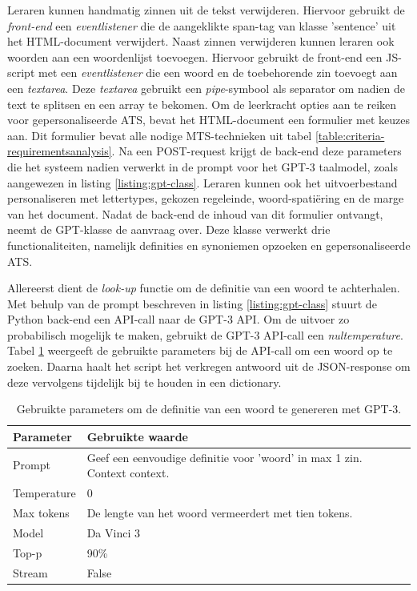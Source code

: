 Leraren kunnen handmatig zinnen uit de tekst verwijderen. Hiervoor gebruikt de \textit{front-end} een \textit{eventlistener} die de aangeklikte span-tag van klasse 'sentence' uit het HTML-document verwijdert. Naast zinnen verwijderen kunnen leraren ook woorden aan een woordenlijst toevoegen. Hiervoor gebruikt de front-end een JS-script met een \textit{eventlistener} die een woord en de toebehorende zin toevoegt aan een \textit{textarea}. Deze \textit{textarea} gebruikt een \textit{pipe}-symbool als separator om nadien de text te splitsen en een array te bekomen. Om de leerkracht opties aan te reiken voor gepersonaliseerde ATS, bevat het HTML-document een formulier met keuzes aan. Dit formulier bevat alle nodige MTS-technieken uit tabel \ref{table:criteria-requirementsanalysis}. Na een POST-request krijgt de back-end deze parameters die het systeem nadien verwerkt in de prompt voor het GPT-3 taalmodel, zoals aangewezen in listing \ref{listing:gpt-class}. Leraren kunnen ook het uitvoerbestand personaliseren met lettertypes, gekozen regeleinde, woord-spatiëring en de marge van het document. Nadat de back-end de inhoud van dit formulier ontvangt, neemt de GPT-klasse de aanvraag over. Deze klasse verwerkt drie functionaliteiten, namelijk definities en synoniemen opzoeken en gepersonaliseerde ATS.

\medspace

Allereerst dient de \textit{look-up} functie om de definitie van een woord te achterhalen. Met behulp van de prompt beschreven in listing \ref{listing:gpt-class} stuurt de Python back-end een API-call naar de GPT-3 API. Om de uitvoer zo probabilisch mogelijk te maken, gebruikt de GPT-3 API-call een \textit{nultemperature}. Tabel \ref{table:gpt-3-look-up} weergeeft de gebruikte parameters bij de API-call om een woord op te zoeken. Daarna haalt het script het verkregen antwoord uit de JSON-response om deze vervolgens tijdelijk bij te houden in een dictionary.

\begin{center}
	\begin{table}[H]
		\begin{tabular}{| m{5cm}| m{8cm} |}
			\hline
			Parameter & Gebruikte waarde \\ \hline
			Prompt & Geef een eenvoudige definitie voor '{woord}' in max 1 zin. Context {context}. \\ \hline
			Temperature & 0 \\ \hline
			Max tokens & De lengte van het woord vermeerdert met tien tokens. \\ \hline
			Model & Da Vinci 3 \\ \hline
			Top-p & 90\% \\ \hline
			Stream & False \\ \hline
		\end{tabular}
	\caption{Gebruikte parameters om de definitie van een woord te genereren met GPT-3.}
	\label{table:gpt-3-look-up}
	\end{table}
\end{center}

